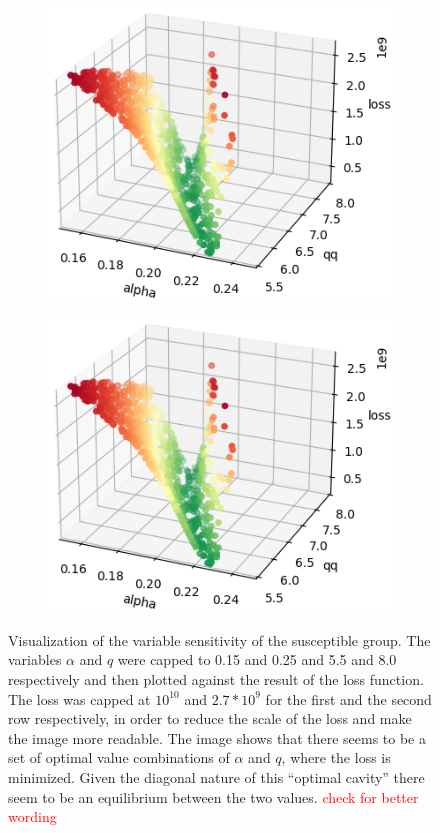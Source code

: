 \begin{figure}
\begin{subfigure}[b]{0.4\textwidth}
		\includegraphics[width=\textwidth]{./figures/sensitivity/sensitivity_zoom2_0_2.png}	
	\end{subfigure}
	\begin{subfigure}[b]{0.4\textwidth}
		\centering
		\includegraphics[width=\textwidth]{./figures/sensitivity/sensitivity_zoom2_0_2.png}	
	\end{subfigure}
	\caption{Visualization of the variable sensitivity of the susceptible group. The variables $\alpha$ and $q$ were
		capped to 0.15 and 0.25 and 5.5 and 8.0 respectively and then plotted against the result of the loss function.
		The loss was capped at $10^{10}$ and $2.7*10^{9}$ for the first and the second row respectively, in order to
		reduce the scale of the loss and make the image more readable. The image shows that there seems to be a set of
		optimal value combinations of $\alpha$ and $q$, where the loss is minimized. Given the diagonal nature of this
		``optimal cavity'' there seem to be an equilibrium between the two values.
		\textcolor{red}{check for better wording} %
		}
	\label{fig:sensitivity_zoom1}
\end{figure}

